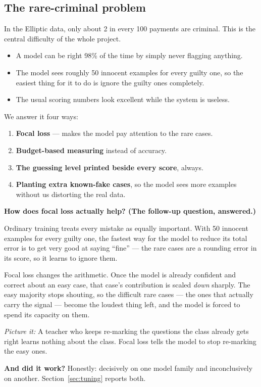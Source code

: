 \documentclass[11pt,a4paper]{article}
\newcommand{\pw}[1]{\textit{\textcolor{accent}{Picture it:}} #1}
\begin{document}
\subsection{The rare-criminal problem}

In the Elliptic data, only about 2 in every 100 payments are criminal. This is
the central difficulty of the whole project.

\begin{itemize}
  \item A model can be right 98\% of the time by simply never flagging anything.
  \item The model sees roughly 50 innocent examples for every guilty one, so the
        easiest thing for it to do is ignore the guilty ones completely.
  \item The usual scoring numbers look excellent while the system is useless.
\end{itemize}

We answer it four ways:

\begin{enumerate}
  \item \textbf{Focal loss} --- makes the model pay attention to the rare cases.
  \item \textbf{Budget-based measuring} instead of accuracy.
  \item \textbf{The guessing level printed beside every score}, always.
  \item \textbf{Planting extra known-fake cases}, so the model sees more
        examples without us distorting the real data.
\end{enumerate}

\begin{keybox}
\textbf{How does focal loss actually help? (The follow-up question, answered.)}

Ordinary training treats every mistake as equally important. With 50 innocent
examples for every guilty one, the fastest way for the model to reduce its total
error is to get very good at saying ``fine'' --- the rare cases are a rounding
error in its score, so it learns to ignore them.

Focal loss changes the arithmetic. Once the model is already confident and
correct about an easy case, that case's contribution is scaled \emph{down}
sharply. The easy majority stops shouting, so the difficult rare cases --- the
ones that actually carry the signal --- become the loudest thing left, and the
model is forced to spend its capacity on them.

\pw{A teacher who keeps re-marking the questions the class already gets right
learns nothing about the class. Focal loss tells the model to stop re-marking
the easy ones.}

\textbf{And did it work?} Honestly: decisively on one model family and
inconclusively on another. Section~\ref{sec:tuning} reports both.
\end{keybox}
\end{document}
